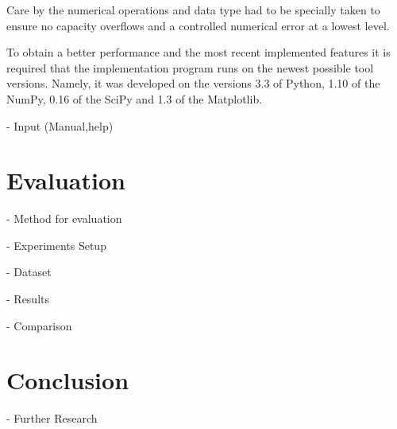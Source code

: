 \documentclass[tuberlin,cic,tc,openright,english,noabntcite,oneside]{iiufrgs}
\begin{document}
Care by the numerical operations and data type had to be specially taken to ensure no capacity overflows and a controlled numerical error at a lowest level.

To obtain a better performance and the most recent implemented features it is required that the implementation program runs on the newest possible tool versions. Namely, it was developed on the versions 3.3 of Python, 1.10 of the NumPy, 0.16 of the SciPy and 1.3 of the Matplotlib.

- Input (Manual,help)

\chapter{Evaluation}
- Method for evaluation

- Experiments Setup

- Dataset

- Results

- Comparison

\chapter{Conclusion}
- Further Research

% 

% 

\nocite{*}
%
\printbibliography
\end{document}
